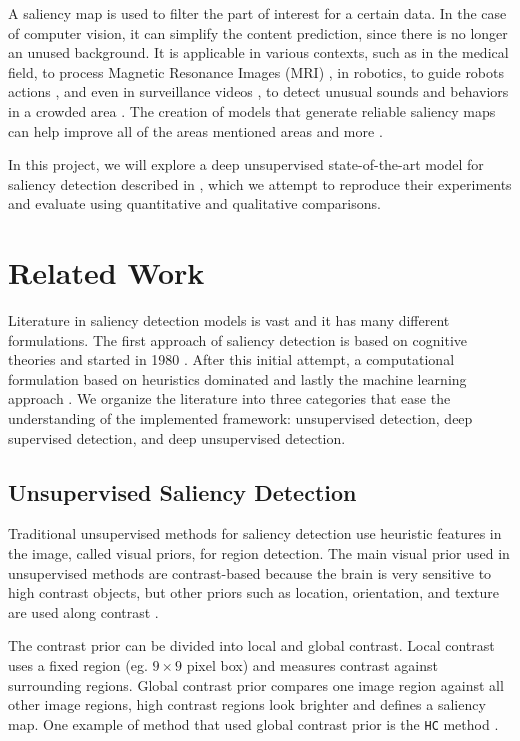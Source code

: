 \documentclass{article}
\begin{document}
A saliency map is used to filter the part of interest for a certain data. In the case of computer vision, it can simplify the content prediction, since there is no longer an unused background. It is applicable in various contexts, such as in the medical field, to process Magnetic Resonance Images (MRI) \cite{Amit2017}, in robotics, to guide robots actions \cite{Zhang2011}, and even in surveillance videos \cite{Guraya2010}, to detect unusual sounds and behaviors in a crowded area \cite{Dunin2005, Nguyen2019}. The creation of models that generate reliable saliency maps can help improve all of the areas mentioned areas and more \cite{Dunin2005, Ren2014, Abreu2017}.

In this project, we will explore a deep unsupervised state-of-the-art model for saliency detection described in \cite{zhang2018}, which we attempt to reproduce their experiments and evaluate using quantitative and qualitative comparisons.

\section{Related Work}

Literature in saliency detection models is vast and it has many different formulations. The first approach of saliency detection is based on cognitive theories and started in 1980 \cite{ullah2020}. After this initial attempt, a computational formulation based on heuristics dominated and lastly the machine learning approach \cite{ullah2020}. We organize the literature into three categories that ease the understanding of the implemented framework: unsupervised detection, deep supervised detection, and deep unsupervised detection. 

\subsection{Unsupervised Saliency Detection}

Traditional unsupervised methods for saliency detection use heuristic features in the image, called visual priors, for region detection. The main visual prior used in unsupervised methods are contrast-based because the brain is very sensitive to high contrast objects, but other priors such as location, orientation, and texture are used along contrast \cite{ullah2020}.

The contrast prior can be divided into local and global contrast. Local contrast uses a fixed region (eg. $9 \times 9$ pixel box) and measures contrast against surrounding regions. Global contrast prior compares one image region against all other image regions, high contrast regions look brighter and defines a saliency map. One example of method that used global contrast prior is the \texttt{HC} method \cite{ullah2020}. 
\end{document}

